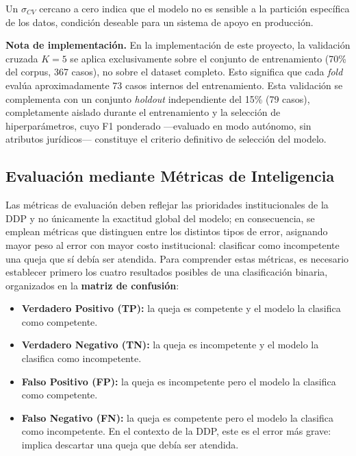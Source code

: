 Un $\sigma_{CV}$ cercano a cero indica que el modelo no es sensible a la
partición específica de los datos, condición deseable para un sistema de apoyo
en producción.

\noindent\textbf{Nota de implementación.} En la implementación de este proyecto,
la validación cruzada $K = 5$ se aplica exclusivamente sobre el conjunto de
entrenamiento (70\% del corpus, 367 casos), no sobre el dataset completo. Esto
significa que cada \textit{fold} evalúa aproximadamente 73 casos internos del
entrenamiento. Esta validación se complementa con un conjunto \textit{holdout}
independiente del 15\% (79 casos), completamente aislado durante el entrenamiento
y la selección de hiperparámetros, cuyo F1 ponderado —evaluado en modo autónomo,
sin atributos jurídicos— constituye el criterio definitivo de selección del
modelo.

\subsection{Evaluación mediante Métricas de Inteligencia}

Las métricas de evaluación deben reflejar las prioridades institucionales de la
DDP y no únicamente la exactitud global del modelo; en consecuencia, se emplean
métricas que distinguen entre los distintos tipos de error, asignando mayor peso
al error con mayor costo institucional: clasificar como incompetente una queja
que sí debía ser atendida. Para comprender estas métricas, es necesario
establecer primero los cuatro resultados posibles de una clasificación binaria,
organizados en la \textbf{matriz de confusión}:

\begin{itemize}
  \item \textbf{Verdadero Positivo (TP):} la queja es competente y el modelo
        la clasifica como competente.
  \item \textbf{Verdadero Negativo (TN):} la queja es incompetente y el modelo
        la clasifica como incompetente.
  \item \textbf{Falso Positivo (FP):} la queja es incompetente pero el modelo
        la clasifica como competente.
  \item \textbf{Falso Negativo (FN):} la queja es competente pero el modelo
        la clasifica como incompetente. En el contexto de la DDP, este es el
        error más grave: implica descartar una queja que debía ser atendida.
\end{itemize}

